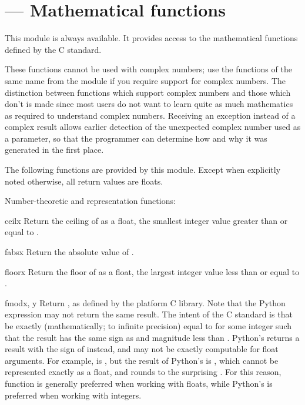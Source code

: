 \section{ ---
         Mathematical functions}


This module is always available.  It provides access to the
mathematical functions defined by the C standard.

These functions cannot be used with complex numbers; use the functions
of the same name from the  module if you require
support for complex numbers.  The distinction between functions which
support complex numbers and those which don't is made since most users
do not want to learn quite as much mathematics as required to
understand complex numbers.  Receiving an exception instead of a
complex result allows earlier detection of the unexpected complex
number used as a parameter, so that the programmer can determine how
and why it was generated in the first place.

The following functions are provided by this module.  Except
when explicitly noted otherwise, all return values are floats.

Number-theoretic and representation functions:

\begin{funcdesc}{ceil}{x}
Return the ceiling of  as a float, the smallest integer value
greater than or equal to .
\end{funcdesc}

\begin{funcdesc}{fabs}{x}
Return the absolute value of .
\end{funcdesc}

\begin{funcdesc}{floor}{x}
Return the floor of  as a float, the largest integer value
less than or equal to .
\end{funcdesc}

\begin{funcdesc}{fmod}{x, y}
Return , as defined by the platform C library.
Note that the Python expression  may not return
the same result.  The intent of the C standard is that
 be exactly (mathematically; to infinite
precision) equal to  for some integer
 such that the result has the same sign as  and
magnitude less than .  Python's
 returns a result with the sign of
 instead, and may not be exactly computable for float arguments.
For example,  is , but the
result of Python's  is , which
cannot be represented exactly as a float, and rounds to the surprising
.  For this reason, function  is generally
preferred when working with floats, while Python's
 is preferred when working with integers.
\end{funcdesc}

